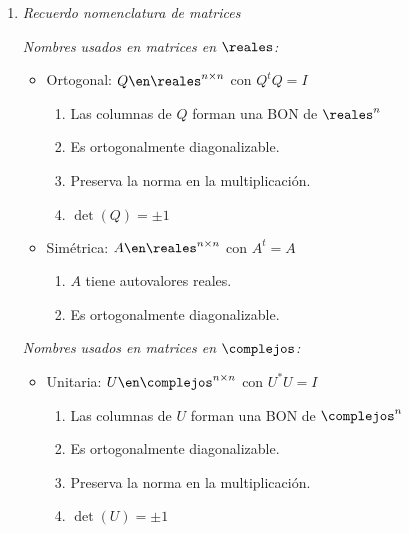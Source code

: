 \begin{enumerate}[label=\tiny\purple{\faIcon{snowman}}]
  \item \hypertarget{teoria-5:matrices}{\textit{Recuerdo nomenclatura de matrices}}

        \begin{minipage}{0.5\textwidth}
          \textit{Nombres usados en matrices en $\reales$:}
          \begin{itemize}
            \item Ortogonal: $Q \en \reales^{n \times n}$  con $Q^tQ = I$
                  \begin{enumerate}[label={\tiny\faIcon{atom}}]
                    \item Las columnas de $Q$ forman una BON de $\reales^n$
                    \item Es ortogonalmente diagonalizable.
                    \item Preserva la norma en la multiplicación.
                    \item $\det(Q) = \pm1$
                  \end{enumerate}

            \item Simétrica: $A \en \reales^{n \times n}$  con $A^t = A$
                  \begin{enumerate}[label={\tiny\faIcon{atom}}]
                    \item $A$ tiene autovalores reales.
                    \item Es ortogonalmente diagonalizable.
                  \end{enumerate}

          \end{itemize}
        \end{minipage}
        \begin{minipage}{0.5\textwidth}
          \textit{Nombres usados en matrices en $\complejos$:}
          \begin{itemize}
            \item Unitaria: $U \en \complejos^{n \times n}$  con $U^*U = I$
                  \begin{enumerate}[label={\tiny\faIcon{atom}}]
                    \item Las columnas de $U$ forman una BON de $\complejos^n$
                    \item Es ortogonalmente diagonalizable.
                    \item Preserva la norma en la multiplicación.
                    \item $\det(U) = \pm1$
                  \end{enumerate}


\end{itemize}
\end{minipage}
\end{enumerate}
